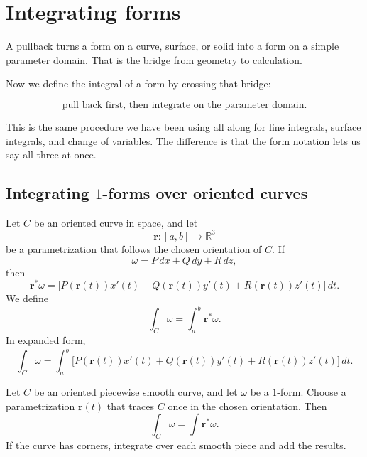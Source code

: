\section{Integrating forms}
\label{sec:16.6}

A pullback turns a form on a curve, surface, or solid into a form on a simple parameter
domain.  That is the bridge from geometry to calculation.

Now we define the integral of a form by crossing that bridge:

\[
\boxed{
    \text{pull back first, then integrate on the parameter domain.}
}
\]

This is the same procedure we have been using all along for line integrals, surface
integrals, and change of variables.  The difference is that the form notation lets us say
all three at once.

\subsection{Integrating \texorpdfstring{\(1\)}{1}-forms over oriented curves}

Let \(C\) be an oriented curve in space, and let
\[
    \mathbf r:[a,b]\to\mathbb R^3
\]
be a parametrization that follows the chosen orientation of \(C\).  If
\[
    \omega=P\,dx+Q\,dy+R\,dz,
\]
then
\[
    \mathbf r^*\omega
    =
    \bigl[
        P(\mathbf r(t))x'(t)
        +
        Q(\mathbf r(t))y'(t)
        +
        R(\mathbf r(t))z'(t)
    \bigr]\,dt.
\]
We define
\[
\boxed{
    \int_C\omega
    =
    \int_a^b \mathbf r^*\omega.
}
\]
In expanded form,
\[
\boxed{
    \int_C\omega
    =
    \int_a^b
    \bigl[
        P(\mathbf r(t))x'(t)
        +
        Q(\mathbf r(t))y'(t)
        +
        R(\mathbf r(t))z'(t)
    \bigr]\,dt.
}
\]

\begin{definition}
Let \(C\) be an oriented piecewise smooth curve, and let \(\omega\) be a \(1\)-form.
Choose a parametrization \(\mathbf r(t)\) that traces \(C\) once in the chosen
orientation.  Then
\[
\boxed{
    \int_C\omega=\int \mathbf r^*\omega.
}
\]
If the curve has corners, integrate over each smooth piece and add the results.
\end{definition}

